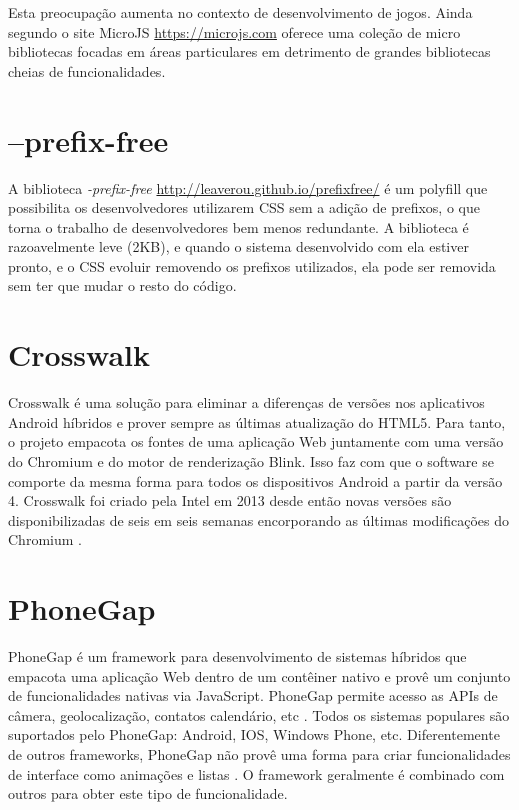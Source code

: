 Esta preocupação aumenta no contexto de desenvolvimento
de jogos. Ainda segundo \citet{creatingFun} o site MicroJS
\url{https://microjs.com} oferece uma coleção de micro bibliotecas
focadas em áreas particulares em detrimento de grandes bibliotecas
cheias de funcionalidades.

\section{--prefix-free} \label{pfree}

A biblioteca \textit{-prefix-free} \url{http://leaverou.github.io/prefixfree/}
é um polyfill que possibilita os desenvolvedores utilizarem CSS sem
a adição de prefixos, o que torna o trabalho de desenvolvedores bem
menos redundante. A biblioteca é razoavelmente leve (2KB), e quando o
sistema desenvolvido com ela estiver pronto, e o CSS evoluir removendo os
prefixos utilizados, ela pode ser removida sem ter que mudar o resto do código.

\section{Crosswalk} \label{crosswalk}

Crosswalk é uma solução para eliminar a diferenças de versões nos
aplicativos Android híbridos e prover sempre as últimas atualização
do HTML5. Para tanto, o projeto empacota os fontes de uma aplicação
Web juntamente com uma versão do Chromium e do motor de renderização
Blink. Isso faz com que o software se comporte da mesma forma para todos
os dispositivos Android a partir da versão 4. Crosswalk foi criado
pela Intel em 2013 desde então novas versões são disponibilizadas
de seis em seis semanas encorporando as últimas modificações do Chromium
\textsc{\autocite{crosswalkProject}}.

\section{PhoneGap}

PhoneGap é um framework para desenvolvimento de sistemas híbridos que
empacota uma aplicação Web dentro de um contêiner nativo e provê um
conjunto de funcionalidades nativas via JavaScript. PhoneGap permite
acesso as APIs de câmera, geolocalização, contatos calendário,
etc \textsc{\autocite[p. 3]{crossPlatformAppsAnimations}}. Todos os sistemas
populares são suportados pelo PhoneGap: Android, IOS, Windows Phone,
etc. Diferentemente de outros frameworks, PhoneGap não provê uma
forma para criar funcionalidades de interface como animações e listas
\textsc{\autocite[p. 15]{viabilityBusinessApplications}}. O framework 
geralmente é combinado com outros para obter este tipo de funcionalidade.

